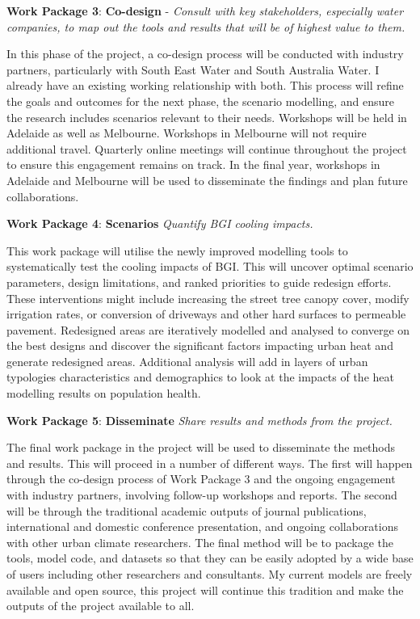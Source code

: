 \textbf{Work Package 3}: \textbf{Co-design} - \emph{Consult with key stakeholders, especially water companies, to map out the tools and results that will be of highest value to them. }

In this phase of the project, a co-design process will be conducted with industry partners, particularly with South East Water and South Australia Water. I already have an existing working relationship with both. This process will refine the goals and outcomes for the next phase, the scenario modelling, and ensure the research includes scenarios relevant to their needs. Workshops will be held in Adelaide as well as Melbourne. Workshops in Melbourne will not require additional travel. Quarterly online meetings will continue throughout the project to ensure this engagement remains on track. In the final year, workshops in Adelaide and Melbourne will be used to disseminate the findings and plan future collaborations.

\textbf{Work Package 4}: \textbf{Scenarios} \emph{Quantify BGI cooling impacts.  }

This work package will utilise the newly improved modelling tools to systematically test the cooling impacts of BGI. This will uncover optimal scenario parameters, design limitations, and ranked priorities to guide redesign efforts. These interventions might include increasing the street tree canopy cover, modify irrigation rates, or  conversion of driveways and other hard surfaces to permeable pavement. Redesigned areas are iteratively modelled and analysed to converge on the best designs and discover the significant factors impacting urban heat and generate redesigned areas. Additional analysis will add in layers of urban typologies characteristics and demographics to look at the impacts of the heat modelling results on population health.
 
\textbf{Work Package 5}: \textbf{Disseminate} \emph{Share results and methods from the project.  }

The final work package in the project will be used to disseminate the methods and results. This will proceed in a number of different ways. The first will happen through the co-design process of Work Package 3 and the ongoing engagement with industry partners, involving follow-up workshops and reports. The second will be through the traditional academic outputs of journal publications, international and domestic conference presentation, and ongoing collaborations with other urban climate researchers. The final method will be to package the tools, model code, and datasets so that they can be easily adopted by a wide base of users including other researchers and consultants. My current models are freely available and open source, this project will continue this tradition and make the outputs of the project available to all.


